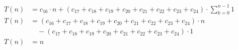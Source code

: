 \begin{subequations}
\label{eq:findlinesegments-startendx}
\begin{align}
\label{eq:findlinesegments7}
T(n)& = c_{16} \cdot n + (c_{17} + c_{18} + c_{19} + c_{20} + c_{21} + c_{22} + c_{23} + c_{24}) \cdot
 \sum_{k=0}^{n-1} 1 \\
\label{eq:findlinesegments8}
T(n)& = (c_{16} + c_{17} + c_{18} + c_{19} + c_{20} + c_{21} + c_{22} + c_{23} + c_{24}) \cdot n \\
& \quad - (c_{17} + c_{18} + c_{19} + c_{20} + c_{21} + c_{22} + c_{23} + c_{24}) \cdot 1 \nonumber \\
\label{eq:findlinesegments9}
T(n)& = n
\end{align}
\end{subequations}
